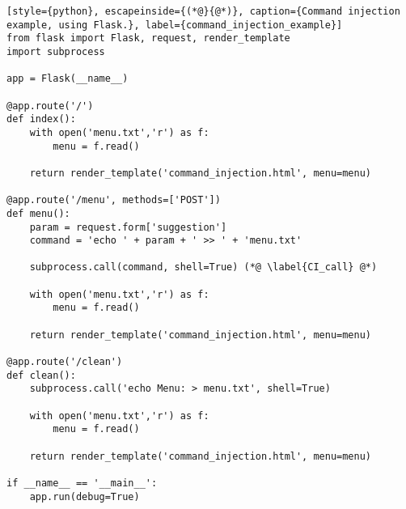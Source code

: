 \begin{lstlisting}[style={python}, escapeinside={(*@}{@*)}, caption={Command injection example, using Flask.}, label={command_injection_example}]
from flask import Flask, request, render_template
import subprocess

app = Flask(__name__)

@app.route('/')
def index():
    with open('menu.txt','r') as f:
        menu = f.read()

    return render_template('command_injection.html', menu=menu)

@app.route('/menu', methods=['POST'])
def menu():
    param = request.form['suggestion']
    command = 'echo ' + param + ' >> ' + 'menu.txt'

    subprocess.call(command, shell=True) (*@ \label{CI_call} @*)

    with open('menu.txt','r') as f:
        menu = f.read()

    return render_template('command_injection.html', menu=menu)

@app.route('/clean')
def clean():
    subprocess.call('echo Menu: > menu.txt', shell=True)

    with open('menu.txt','r') as f:
        menu = f.read()
    
    return render_template('command_injection.html', menu=menu)

if __name__ == '__main__':
    app.run(debug=True)
\end{lstlisting}
